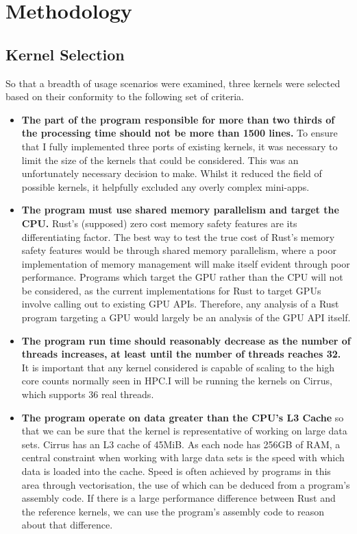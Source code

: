 \chapter{Methodology}
\section{Kernel Selection}
So that a breadth of usage scenarios were examined, three kernels were selected based on their conformity to the following set of criteria.
\begin{itemize}
  \item \textbf{The part of the program responsible for more than two thirds of the processing time should not be more than 1500 lines.} To ensure that I fully implemented three ports of existing kernels, it was necessary to limit the size of the kernels that could be considered. This was an unfortunately necessary decision to make. Whilst it reduced the field of possible kernels, it helpfully excluded any overly complex mini-apps.

  \item \textbf{The program must use shared memory parallelism and target the CPU.} Rust's (supposed) zero cost memory safety features are its differentiating factor. The best way to test the true cost of Rust's memory safety features would be through shared memory parallelism, where a poor implementation of memory management will make itself evident through poor performance. Programs which target the GPU rather than the CPU will not be considered, as the current implementations for Rust to target GPUs involve calling out to existing GPU APIs. Therefore, any analysis of a Rust program targeting a GPU would largely be an analysis of the GPU API itself.

  \item \textbf{The program run time should reasonably decrease as the number of threads increases, at least until the number of threads reaches 32.} It is important that any kernel considered is capable of scaling to the high core counts normally seen in HPC.I will be running the kernels on Cirrus, which supports 36 real threads.

  \item \textbf{The program operate on data greater than the CPU's L3 Cache} so that we can be sure that the kernel is representative of working on large data sets. Cirrus has an L3 cache of 45MiB. As each node has 256GB of RAM, a central constraint when working with large data sets is the speed with which data is loaded into the cache. Speed is often achieved by programs in this area through vectorisation, the use of which can be deduced from a program's assembly code. If there is a large performance difference between Rust and the reference kernels, we can use the program's assembly code to reason about that difference.


\end{itemize}
